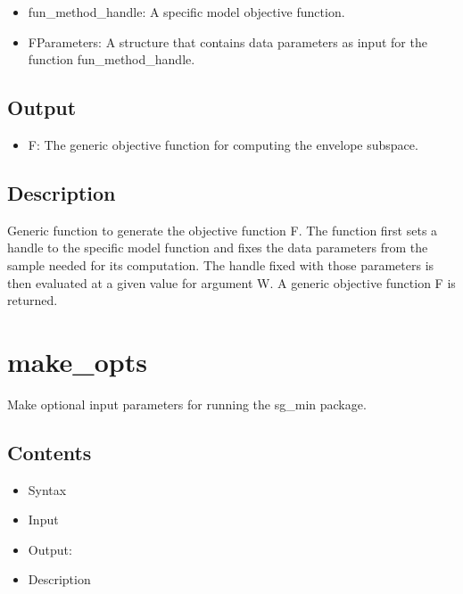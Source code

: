 \documentclass[a4paper,11pt,openany]{memoir}
\begin{document}
\begin{itemize}
\setlength{\itemsep}{-1ex}
   \item fun\_method\_handle: A specific model objective function.
   \item FParameters: A structure that contains data parameters as input for the function fun\_method\_handle.
\end{itemize}


\subsection*{Output}

\begin{itemize}
\setlength{\itemsep}{-1ex}
   \item F: The generic objective function for computing the envelope subspace.
\end{itemize}


\subsection*{Description}

\begin{par}
Generic function to generate the objective function F. The function first sets a handle to the specific model function and fixes the data parameters from the sample needed for its computation. The handle fixed with those parameters is then evaluated at a given value for argument W. A generic objective function F is returned.
\end{par} \vspace{1em}

\newpage 

\rmfamily
\color{black}\section{make\_opts}

\begin{par}
Make optional input parameters for running the sg\_min package.
\end{par} \vspace{1em}

\subsection*{Contents}

\begin{itemize}
\setlength{\itemsep}{-1ex}
   \item Syntax
   \item Input
   \item Output:
   \item Description
\end{itemize}
\end{document}
